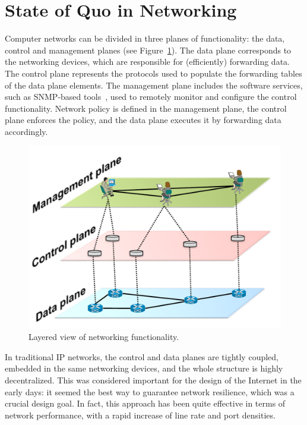 \section{State of Quo in Networking}
\label{traditional_nets}

Computer networks can be divided in three planes of functionality: the
data, control and management planes (see Figure~\ref{fig:currentnetplanes}).  
The data plane corresponds to the networking devices, which are responsible 
for (efficiently) forwarding data.  The control plane represents the protocols 
used to populate the forwarding tables of the data plane elements. The management 
plane includes the software services, such as SNMP-based tools~\cite{presuhn2002}, 
used to remotely monitor and configure the control functionality.  Network policy 
is defined in the management plane, the control plane enforces the policy, and the 
data plane executes it by forwarding data accordingly.

\begin{figure}[t!]
\centering
\includegraphics[width=0.75\columnwidth]{figures/fig2_network_functionality.pdf}
\caption{Layered view of networking functionality.}
\label{fig:currentnetplanes}
\end{figure}

In traditional IP networks, the control and data planes are tightly coupled, embedded in the same networking devices, and the whole structure is highly decentralized.
This was considered important for the design of the Internet in the early days: it seemed 
the best way to guarantee network resilience, which was a crucial design goal. In fact, 
this approach has been quite effective in terms of network performance, with a rapid 
increase of line rate and port densities.

